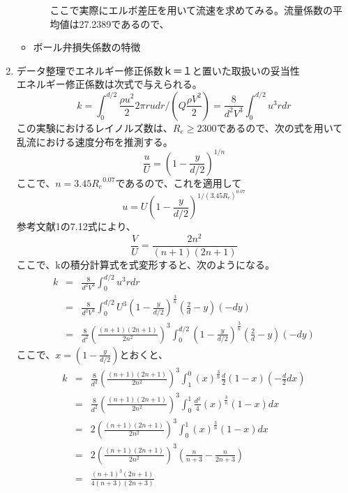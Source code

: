 \documentclass[a4j,twoside,openright,11pt]{jarticle}
\begin{document}
\begin{enumerate}
\begin{itemize}
\begin{itemize}
ここで実際にエルボ差圧を用いて流速を求めてみる。流量係数の平均値は27.2389であるので、
\end{itemize}




\item ボール弁損失係数の特徴
\end{itemize}
\item データ整理でエネルギー修正係数ｋ＝１と置いた取扱いの妥当性\\
エネルギー修正係数は次式で与えられる。
\begin{equation}
k=\int_0^{d/2}\frac{\rho u^2}{2}2 \pi rudr/(Q\frac{\rho V^2}{2})=\frac{8}{d^2V^3}\int_0^{d/2}u^3rdr
\end{equation}
この実験におけるレイノルズ数は、$R_e\geq 2300$であるので、次の式を用いて乱流における速度分布を推測する。
\begin{equation}
\frac{u}{U}=(1-\frac{y}{d/2})^{1/n}
\end{equation}
ここで、$n=3.45{R_e}^{0.07}$であるので、これを適用して
\begin{equation}
u=U (1-\frac{y}{d/2})^{1/(3.45{R_e})^{0.07}}
\end{equation}
参考文献1の7.12式により、
\begin{equation}
\frac{V}{U}=\frac{2n^2}{(n+1)(2n+1)}
\end{equation}
ここで、kの積分計算式を式変形すると、次のようになる。
\begin{eqnarray}
k&=&\frac{8}{d^2V^3}\int_0^{d/2}u^3rdr\nonumber\\
 &=&\frac{8}{d^2V^3}\int_0^{d/2}U^3 (1-\frac{y}{d/2})^{\frac{3}{n}}(\frac{2}{d}-y)(-dy)\nonumber\\
 &=&\frac{8}{d^2}(\frac{(n+1)(2n+1)}{2n^2})^3\int_0^{d/2}(1-\frac{y}{d/2})^{\frac{3}{n}}(\frac{2}{d}-y)(-dy)
\end{eqnarray}
ここで、$x=(1-\frac{y}{d/2})$とおくと、
\begin{eqnarray}
k&=&\frac{8}{d^2}(\frac{(n+1)(2n+1)}{2n^2})^3\int_1^{0}(x)^{\frac{3}{n}}\frac{d}{2}(1-x)(-\frac{d}{2}dx)\nonumber\\
 &=&\frac{8}{d^2}(\frac{(n+1)(2n+1)}{2n^2})^3\int_0^{1}\frac{d^2}{4}(x)^{\frac{3}{n}}(1-x)dx\nonumber\\
 &=&2\left(\frac{(n+1)(2n+1)}{2n^2}\right)^3\int_0^{1}(x)^{\frac{3}{n}}(1-x)dx\nonumber\\
 &=&2\left(\frac{(n+1)(2n+1)}{2n^2}\right)^3(\frac{n}{n+3}-\frac{n}{2n+3})\nonumber\\
 &=&\frac{(n+1)^3(2n+1)}{4(n+3)(2n+3)}
\end{eqnarray}

\end{enumerate}
\end{document}
